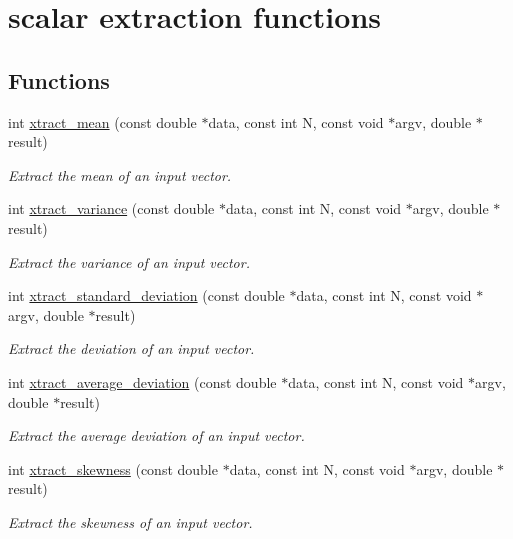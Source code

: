 \hypertarget{group__scalar}{\section{scalar extraction functions}
\label{group__scalar}
}
\subsection*{Functions}
\begin{DoxyCompactItemize}
\item 
int \hyperlink{group__scalar_ga5fae18a1677f979b147e2ee25ad3ff53}{xtract\-\_\-mean} (const double $\ast$data, const int N, const void $\ast$argv, double $\ast$result)
\begin{DoxyCompactList}\small\item\em Extract the mean of an input vector. \end{DoxyCompactList}\item 
int \hyperlink{group__scalar_ga516c61ec30c1a44845ab307771cdbe1f}{xtract\-\_\-variance} (const double $\ast$data, const int N, const void $\ast$argv, double $\ast$result)
\begin{DoxyCompactList}\small\item\em Extract the variance of an input vector. \end{DoxyCompactList}\item 
int \hyperlink{group__scalar_ga190f8f65fff1e5c889b62e9f45aa46cc}{xtract\-\_\-standard\-\_\-deviation} (const double $\ast$data, const int N, const void $\ast$argv, double $\ast$result)
\begin{DoxyCompactList}\small\item\em Extract the deviation of an input vector. \end{DoxyCompactList}\item 
int \hyperlink{group__scalar_ga53a6af1a987571b5a38745867ae2bf7d}{xtract\-\_\-average\-\_\-deviation} (const double $\ast$data, const int N, const void $\ast$argv, double $\ast$result)
\begin{DoxyCompactList}\small\item\em Extract the average deviation of an input vector. \end{DoxyCompactList}\item 
int \hyperlink{group__scalar_ga084f4fa1594ffe04efdd980eb2851afc}{xtract\-\_\-skewness} (const double $\ast$data, const int N, const void $\ast$argv, double $\ast$result)
\begin{DoxyCompactList}\small\item\em Extract the skewness of an input vector. \end{DoxyCompactList}\item 

\end{DoxyCompactItemize}
